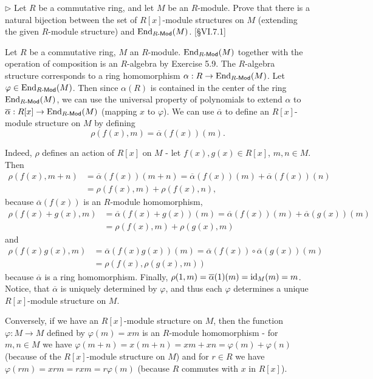 \begin{problem}
	$\triangleright$ Let $R$ be a commutative ring, and let $M$ be an $R$-module. Prove that there is a natural bijection between the set of $R[x]$-module structures on $M$ (extending the given $R$-module structure) and $\mathrm{End}_{R\text{-}\mathsf{Mod}}(M)$. [\S VI.7.1]
\end{problem}

\begin{solution}
	Let $R$ be a commutative ring, $M$ an $R$-module. $\mathrm{End}_{R\text{-}\mathsf{Mod}}(M)$ together with the operation of composition is an $R$-algebra by Exercise 5.9. The $R$-algebra structure corresponds to a ring homomorphism $\alpha: R \to \mathrm{End}_{R\text{-}\mathsf{Mod}}(M)$. Let $\varphi \in \mathrm{End}_{R\text{-}\mathsf{Mod}}(M)$. Then since $\alpha(R)$ is contained in the center of the ring $\mathrm{End}_{R\text{-}\mathsf{Mod}}(M)$, we can use the universal property of polynomials to extend $\alpha$ to $\overline{\alpha}: R[x] \to \mathrm{End}_{R\text{-}\mathsf{Mod}}(M)$ (mapping $x$ to $\varphi$). We can use $\overline{\alpha}$ to define an $R[x]$-module structure on $M$ by defining
	\[
		\rho(f(x), m) = \overline{\alpha}(f(x))(m) \text{.}
	\]
	
	Indeed, $\rho$ defines an action of $R[x]$ on $M$ - let $f(x), g(x) \in R[x]$, $m, n \in M$. Then
	\begin{align*}
		\rho(f(x), m + n) &= \overline{\alpha}(f(x))(m + n) = \overline{\alpha}(f(x))(m) + \overline{\alpha}(f(x))(n) \\
		&= \rho(f(x), m) + \rho(f(x), n) \text{,}
	\end{align*}
	because $\overline{\alpha}(f(x))$ is an $R$-module homomorphism,
	\begin{align*}
		\rho(f(x) + g(x), m) &= \overline{\alpha}(f(x) + g(x))(m) = \overline{\alpha}(f(x))(m) + \overline{\alpha}(g(x))(m) \\
		&= \rho(f(x), m) + \rho(g(x), m)
	\end{align*}
	and
	\begin{align*}
		\rho(f(x)g(x), m) &= \overline{\alpha}(f(x)g(x))(m) = \overline{\alpha}(f(x)) \circ \overline{\alpha}(g(x)) (m) \\
		&= \rho(f(x), \rho(g(x), m))
	\end{align*}
	because $\overline{\alpha}$ is a ring homomorphism. Finally, $\rho(1, m) = \overline{\alpha}(1)(m) = \mathrm{id}_M(m) = m$. Notice, that $\overline{\alpha}$ is uniquely determined by $\varphi$, and thus each $\varphi$ determines a unique $R[x]$-module structure on $M$.
	
	Conversely, if we have an $R[x]$-module structure on $M$, then the function $\varphi: M \to M$ defined by $\varphi(m) = xm$ is an $R$-module homomorphism - for $m, n \in M$ we have $\varphi(m + n) = x(m + n) = xm + xn = \varphi(m) + \varphi(n)$ (because of the $R[x]$-module structure on $M$) and for $r \in R$ we have $\varphi(rm) = xrm = rxm = r \varphi(m)$ (because $R$ commutes with $x$ in $R[x]$).
\end{solution}

